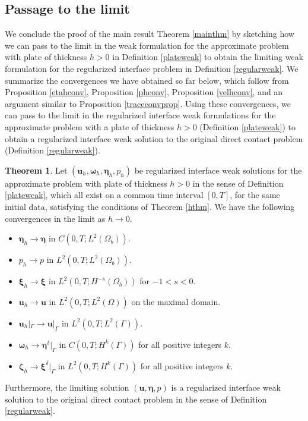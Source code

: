 \documentclass[11pt]{article}
\newcommand{\bd}{\boldsymbol}
\theoremstyle{definition}
\newtheorem{theorem}{Theorem}[section]
\begin{document}
\subsection{Passage to the limit}

We conclude the proof of the main result Theorem \ref{mainthm} by sketching how we can pass to the limit in the weak formulation for the approximate problem with plate of thickness $h > 0$ in Definition \ref{plateweak} to obtain the limiting weak formulation for the regularized interface problem in Definition \ref{regularweak}. We summarize the convergences we have obtained so far below, which follow from Proposition \ref{etahconv}, Proposition \ref{phconv}, Proposition \ref{velhconv}, and an argument similar to Proposition \ref{traceconvprop}. Using these convergences, we can pass to the limit in the regularized interface weak formulations for the approximate problem with a plate of thickness $h > 0$ (Definition \ref{plateweak}) to obtain a regularized interface weak solution to the original direct contact problem (Definition \ref{regularweak}).  

\begin{theorem}\label{singularlimit}
Let $(\bd{u}_{h}, \bd{\omega}_{h}, \bd{\eta}_{h}, p_{h})$ be regularized interface weak solutions for the approximate problem with plate of thickness $h > 0$ in the sense of Definition \ref{plateweak}, which all exist on a common time interval $[0, T]$, for the same initial data, satisfying the conditions of Theorem \ref{hthm}. We have the following convergences in the limit as $h \to 0$.
\begin{itemize}
\item $\bd{\eta}_{h} \to \bd{\eta}$ in $C(0, T; L^{2}(\Omega_{b}))$.
\item $p_{h} \to p$ in $L^{2}(0, T; L^{2}(\Omega_{b}))$.
\item $\bd{\xi}_{h} \to \bd{\xi}$ in $L^{2}(0, T; H^{-s}(\Omega_{b}))$ for $-1 < s < 0$. 
\item $\bd{u}_{h} \to \bd{u}$ in $L^{2}(0, T; L^{2}(\Omega))$ on the maximal domain.
\item $\bd{u}_{h}|_{\Gamma} \to \bd{u}|_{\Gamma}$ in $L^{2}(0, T; L^{2}(\Gamma))$. 
\item $\bd{\omega}_{h} \to \bd{\eta}^{\delta}|_{\Gamma}$ in $C(0, T; H^{k}(\Gamma))$ for all positive integers $k$.
\item $\bd{\zeta}_{h} \to \bd{\xi}^{\delta}|_{\Gamma}$ in $L^{2}(0, T; H^{k}(\Gamma))$ for all positive integers $k$.
\end{itemize}
Furthermore, the limiting solution $(\bd{u}, \bd{\eta}, p)$ is a regularized interface weak solution to the original direct contact problem in the sense of Definition \ref{regularweak}.
\end{theorem}
\end{document}

